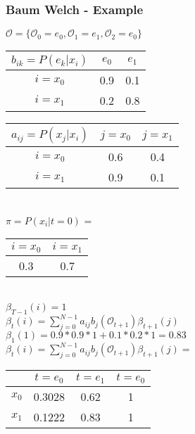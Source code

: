 \begin{frame}
	\frametitle{Baum Welch - Example}
  \begin{table}
  \centering
  $\mathcal{O} = \{\mathcal{O}_0 = e_0, \mathcal{O}_1 = e_1, \mathcal{O}_2 = e_0\}$\\
  \begin{tabular}{| c | c | c |}
  	\hline
    $b_{ik} = P(e_k|x_i)$ & $e_0$ & $e_1$ \\ \hline
    $i = x_0$                 & 0.9   & 0.1   \\ \hline
    $i = x_1$                 & 0.2   & 0.8   \\ \hline
  \end{tabular}
  \begin{tabular}{| c | c | c |}
  	\hline
    $a_{ij} = P(x_j|x_i)$ & $j = x_0$ & $j = x_1$ \\ \hline
    $i = x_0$                 & 0.6   & 0.4   \\ \hline
    $i = x_1$                 & 0.9   & 0.1   \\ \hline
  \end{tabular}
  \\$\pi = P(x_i|t=0)$ =
  \begin{tabular}{| c | c |}
  	\hline
    $i = x_0$ & $i = x_1$ \\ \hline
    0.3   & 0.7   \\ \hline
  \end{tabular}\\
  $\beta_{T-1}(i) = 1$\\
  $\beta_t(i) = \sum\limits_{j=0}^{N-1} a_{ij} b_j(\mathcal{O}_{t+1})\beta_{t+1}(j)$\\
  $\beta_1(1) = 0.9 * 0.9 * 1 + 0.1 * 0.2 * 1 = 0.83$
  $\beta_t(i) = \sum\limits_{j=0}^{N-1} a_{ij} b_j(\mathcal{O}_{t+1})\beta_{t+1}(j) =$
  \begin{tabular}{| c | c | c | c |}
  	\hline
          & $t=e_0$ & $t=e_1$ & $t=e_0$ \\ \hline
    $x_0$ & 0.3028  & 0.62    & 1       \\ \hline
    $x_1$ & 0.1222  & 0.83    & 1       \\ \hline
  \end{tabular}\\
\end{table}
\end{frame}

